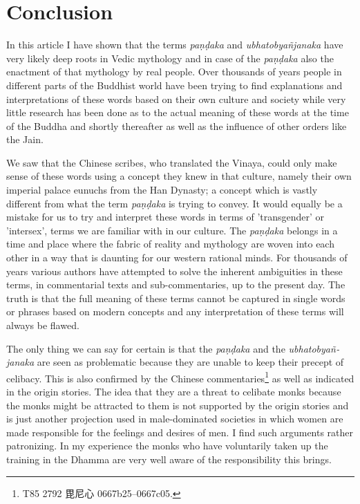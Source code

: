 \section{Conclusion}
In this article I have shown that the terms {\em paṇḍaka} and {\em ubhatob­yañ­janaka} have very likely deep roots in Vedic mythology and in case of the {\em paṇḍaka} also the enactment of that mythology by real people. Over thousands of years people in different parts of the Buddhist world have been trying to find explanations and interpretations of these words based on their own culture and society while very little research has been done as to the actual meaning of these words at the time of the Buddha and shortly thereafter as well as the influence of other orders like the Jain. 

We saw that the Chinese scribes, who translated the Vinaya, could only make sense of these words using a concept they knew in that culture, namely their own imperial palace eunuchs from the Han Dynasty; a concept which is vastly different from what the term {\em paṇḍaka} is trying to convey. It would equally be a mistake for us to try and interpret these words in terms of 'transgender' or 'intersex', terms we are familiar with in our culture. The {\em paṇḍaka} belongs in a time and place where the fabric of reality and mythology are woven into each other in a way that is daunting for our western rational minds. For thousands of years various authors have attempted to solve the inherent ambiguities in these terms, in commentarial texts and sub-commentaries, up to the present day. The truth is that the full meaning of these terms cannot be captured in single words or phrases based on modern concepts and any interpretation of these terms will always be flawed.

The only thing we can say for certain is that the {\em paṇḍaka} and the {\em ubhatob­yañ­janaka} are seen as problematic because they are unable to keep their precept of celibacy. This is also confirmed by the Chinese commentaries\footnote{T85 2792 毘尼心 0667b25–0667c05.} as well as indicated in the origin stories. The idea that they are a threat to celibate monks because the monks might be attracted to them is not supported by the origin stories and is just another projection used in male-dominated societies in which women are made responsible for the feelings and desires of men. I find such arguments rather patronizing. In my experience the monks who have voluntarily taken up the training in the Dhamma are very well aware of the responsibility this brings.

